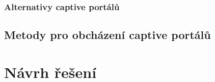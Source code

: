 \documentclass[thesis=M,czech]{FITthesis}[2012/10/20]
\begin{document}
%

\subsection{Alternativy captive portálů}




\section{Metody pro obcházení captive portálů}

%








\chapter{Návrh řešení}
\end{document}
